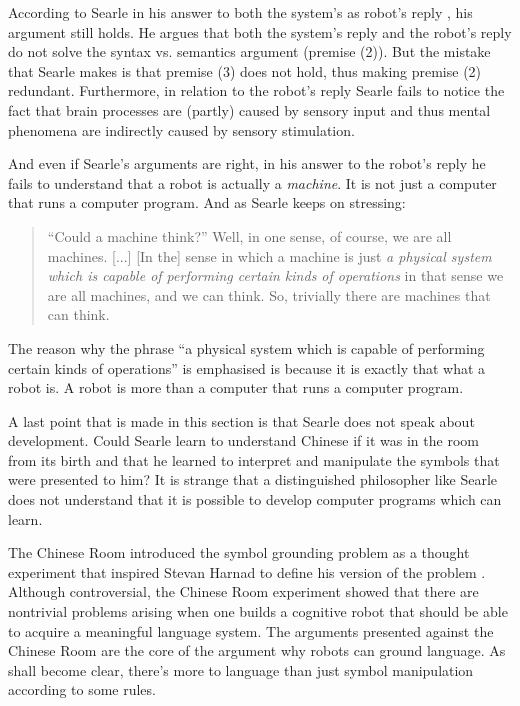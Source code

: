 According to Searle in his answer to both the system's as robot's reply \citep{searle:1984}, his argument still holds. He argues that both the system's reply and the robot's reply do not solve the syntax vs. semantics argument (premise (2)). But the mistake that Searle makes is that premise (3) does not hold, thus making premise (2) redundant. Furthermore, in relation to the robot's reply Searle fails to notice the fact that brain processes are (partly) caused by sensory input and thus mental phenomena are indirectly caused by sensory stimulation.

And even if Searle's arguments are right, in his answer to the robot's reply he fails to understand that a robot is actually a {\em machine}. It is not just a computer that runs a computer program. And as Searle keeps on stressing:

\begin{quote}
``Could a machine think?'' Well, in one sense, of course, we are all machines. [...] [In the] sense in which a machine is just {\em a physical system which is capable of performing certain kinds of operations} in that sense we are all machines, and we can think. So, trivially there are machines that can think. \citep[35, my italics]{searle:1984}
\end{quote}

The reason why the phrase ``a physical system which is capable of performing certain kinds of operations'' is emphasised is because it is exactly that what a robot is. A robot is more than a computer that runs a computer program.

A last point that is made in this section is that Searle does not speak about development. Could Searle learn to understand Chinese if it was in the room from its birth and that he learned to interpret and manipulate the symbols that were presented to him? It is strange that a distinguished philosopher like Searle does not understand that it is possible to develop computer programs which can learn.

\bigskip\noindent{}The Chinese Room introduced the symbol grounding problem as a thought experiment that inspired Stevan Harnad to define his version of the problem \citep{harnad:1990}. Although controversial, the Chinese Room experiment showed that there are nontrivial problems arising when one builds a cognitive robot that should be able to acquire a meaningful language system. The arguments presented against the Chinese Room are the core of the argument why robots can ground language. As shall become clear, there's more to language than just symbol manipulation according to some rules.

